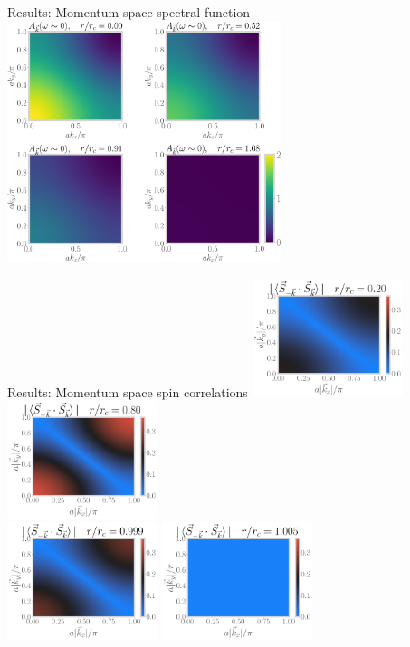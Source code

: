 \documentclass[aspectratio=169]{beamer}
\begin{document}
\begin{frame}{Results: Momentum space spectral function}
\includegraphics[width=0.6\textwidth]{kspace-spectralfunction-all.pdf}
\end{frame}

\begin{frame}{Results: Momentum space spin correlations}
\includegraphics[width=0.33\textwidth]{corr-1.png}
\includegraphics[width=0.33\textwidth]{corr-222.png}\\
\includegraphics[width=0.33\textwidth]{corr-295.png}
\includegraphics[width=0.33\textwidth]{corr-297.png}
\end{frame}
\end{document}
